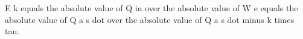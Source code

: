 E k equals the absolute value of Q in over the absolute value of W e equals the absolute value of Q a s dot over the absolute value of Q a s dot minus k times tau.